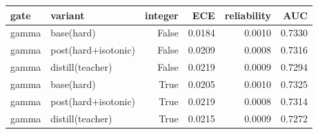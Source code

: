 \begin{tabular}{llrrrr}
\toprule
gate & variant & integer & ECE & reliability & AUC \\
\midrule
gamma & base(hard) & False & 0.0184 & 0.0010 & 0.7330 \\
gamma & post(hard+isotonic) & False & 0.0209 & 0.0008 & 0.7316 \\
gamma & distill(teacher) & False & 0.0219 & 0.0009 & 0.7294 \\
gamma & base(hard) & True & 0.0205 & 0.0010 & 0.7325 \\
gamma & post(hard+isotonic) & True & 0.0219 & 0.0008 & 0.7314 \\
gamma & distill(teacher) & True & 0.0215 & 0.0009 & 0.7272 \\
\bottomrule
\end{tabular}
